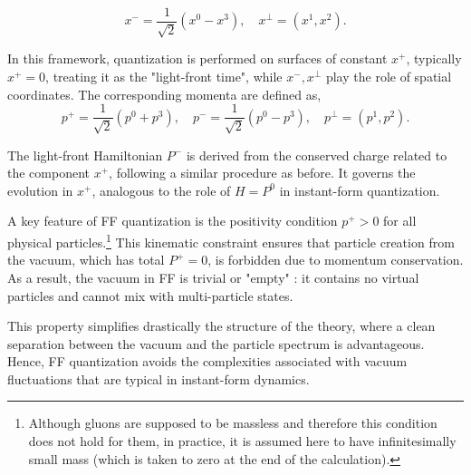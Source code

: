 \documentclass[11pt,a4paper,twoside,pdf]{article}
\numberwithin{equation}{section}
\begin{document}
\begin{equation}
    x^- = \frac{1}{\sqrt{2}} (x^0 - x^3), \quad x^\perp = (x^1, x^2).
\end{equation}

In this framework, quantization is performed on surfaces of constant \( x^+ \), 
typically $x^+=0$,
treating it as the "light-front time", while \( x^-, x^\perp \) play the role 
of spatial coordinates. The corresponding momenta are defined as,
\begin{equation}
    p^+ = \frac{1}{\sqrt{2}} (p^0 + p^3), \quad
    p^- = \frac{1}{\sqrt{2}} (p^0 - p^3), \quad
    p^\perp = (p^1, p^2).
\end{equation}

The light-front Hamiltonian \( P^- \) is derived from the conserved charge related 
to the component \( x^+ \), following a similar procedure as before. It governs 
the evolution in \( x^+ \), analogous to the role of \( H = P^0 \) in instant-form 
quantization.

A key feature of FF quantization is the positivity condition \( p^+ > 0 \) 
for all physical particles.\footnote{Although gluons are supposed to be massless and therefore this condition
does not hold for them, in practice, it is assumed here to have infinitesimally 
small mass (which is taken to zero at the end of the calculation).}
 This kinematic constraint ensures that particle 
creation from the vacuum, which has total \( P^+ = 0 \), is forbidden due to 
momentum conservation. As a result, the vacuum in FF is trivial or "empty" \cite{Brodsky_1998}: 
it contains no virtual particles and cannot mix with multi-particle states.

This property simplifies drastically the structure of the theory, 
where a clean separation between the vacuum and 
the particle spectrum is advantageous. Hence, FF quantization avoids the 
complexities associated with vacuum fluctuations that are typical in 
instant-form dynamics.
\end{document}
